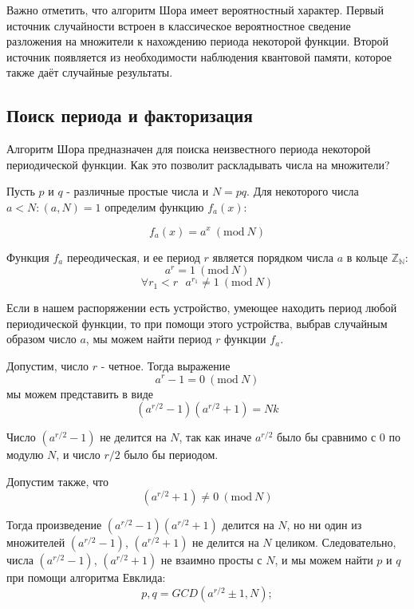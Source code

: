 \documentclass[14pt]{article}
\newcommand{\Mod}[1]{\ (\mathrm{mod}\ #1)}
\begin{document}
Важно отметить, что алгоритм Шора имеет вероятностный характер. Первый источник случайности встроен в классическое вероятностное сведение разложения на множители к нахождению периода некоторой функции. Второй источник появляется из необходимости наблюдения квантовой памяти, которое также даёт случайные результаты.
	
	\newpage
	\subsection{Поиск периода и факторизация}
	Алгоритм Шора предназначен для поиска неизвестного периода некоторой периодической функции.
	Как это позволит раскладывать числа на множители?
	
	Пусть $p$ и $q$ - различные простые числа и $N = pq$. Для некоторого числа $a < N: (a, N) = 1$ определим функцию $f_a(x)$:
	
	\begin{equation}
		f_a(x) = a^x \Mod{N}
	\end{equation}
	
	Функция $f_a$ переодическая, и ее период $r$ является порядком числа $a$ в кольце $\mathbb{Z_N}$:
	\begin{equation}
		a^r = 1 \Mod{N}
	\end{equation}
	\begin{equation}
		\forall r_1 < r \text{ } a^{r_1} \neq 1 \Mod{N}
	\end{equation}
	
	Если в нашем распоряжении есть устройство, умеющее находить период любой периодической функции, то при помощи этого устройства, выбрав случайным образом число $a$, мы можем найти период $r$ функции $f_a$.
	
	Допустим, число $r$ - четное. Тогда выражение
	\begin{equation}
		a^r - 1 = 0 \Mod{N}
	\end{equation}
	мы можем представить в виде 
	\begin{equation}
		(a^{r/2} - 1)(a^{r/2} + 1) = Nk
	\end{equation}
	
	Число $(a^{r/2} - 1)$ не делится на $N$, так как иначе $a^{r/2}$ было
бы сравнимо с $0$ по модулю $N$, и число $r/2$ было бы периодом.	
	
	Допустим также, что
	\begin{equation}
		(a^{r/2} + 1) \neq 0 \Mod{N}
	\end{equation}
	
	Тогда произведение $(a^{r/2} - 1)(a^{r/2} + 1)$ делится на $N$, но 
ни один из множителей $(a^{r/2} - 1)$, $(a^{r/2} + 1)$ не делится на $N$
целиком. Следовательно, числа $(a^{r/2} - 1)$, $(a^{r/2} + 1)$ не взаимно
просты с $N$, и мы можем найти $p$ и $q$ при помощи алгоритма Евклида:
	\begin{equation}
		p, q = GCD(a^{r/2} \pm 1, N);
	\end{equation}
\end{document}
